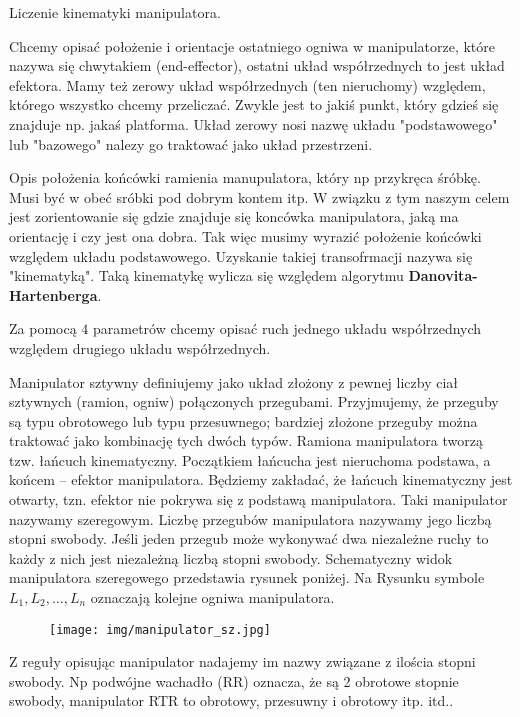 \documentclass{article}
\begin{document}
Liczenie kinematyki manipulatora.

Chcemy opisać położenie i orientacje ostatniego ogniwa w manipulatorze, które nazywa się chwytakiem (end-effector), ostatni układ współrzednych to jest układ efektora. Mamy też zerowy układ współrzednych (ten nieruchomy) względem, którego wszystko chcemy przeliczać. Zwykle jest to jakiś punkt, który gdzieś się znajduje np. jakaś platforma. Układ zerowy nosi nazwę układu "podstawowego" lub "bazowego" nalezy go traktować jako układ przestrzeni.

Opis położenia końcówki ramienia manupulatora, który np przykręca śróbkę. Musi być w obeć sróbki pod dobrym kontem itp. W związku z tym naszym celem jest zorientowanie się gdzie znajduje się koncówka manipulatora, jaką ma orientację i czy jest ona dobra.
Tak więc musimy wyrazić położenie końcówki względem układu podstawowego. Uzyskanie takiej transofrmacji nazywa się "kinematyką".
Taką kinematykę wylicza się względem algorytmu {\bf Danovita-Hartenberga}.


Za pomocą $4$ parametrów chcemy opisać ruch jednego układu współrzednych względem drugiego układu współrzednych.


\newpage

Manipulator sztywny definiujemy jako układ złożony z pewnej liczby
ciał sztywnych (ramion, ogniw) połączonych przegubami. Przyjmujemy,
że przeguby są typu obrotowego lub typu przesuwnego; bardziej złożone
przeguby można traktować jako kombinację tych dwóch typów. Ramiona manipulatora tworzą tzw. łańcuch kinematyczny. Początkiem łańcucha jest nieruchoma podstawa, a końcem – efektor manipulatora. Będziemy zakładać, że łańcuch kinematyczny jest otwarty, tzn. efektor nie
pokrywa się z podstawą manipulatora. Taki manipulator nazywamy szeregowym. Liczbę przegubów manipulatora nazywamy jego liczbą stopni
swobody. Jeśli jeden przegub może wykonywać dwa niezależne ruchy to każdy z nich jest niezależną liczbą stopni swobody. Schematyczny widok manipulatora szeregowego przedstawia rysunek poniżej. Na Rysunku symbole $L_{1}, L_{2}, \dots , L_{n}$ oznaczają kolejne ogniwa manipulatora.


\begin{figure}[h!]
    \centering
    \texttt{[image: img/manipulator\_sz.jpg]}
\end{figure}

Z reguły opisując manipulator nadajemy im nazwy związane z ilościa stopni swobody.
Np podwójne wachadło (RR) oznacza, że są 2 obrotowe stopnie swobody, manipulator RTR to obrotowy, przesuwny i obrotowy itp. itd..
\end{document}
